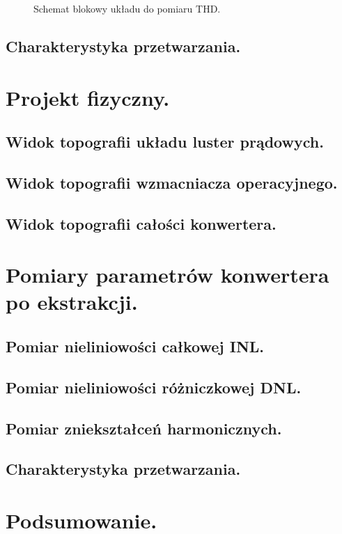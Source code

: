\documentclass[10pt,a4paper]{report}
\theoremstyle{definition}
\theoremstyle{definition}
\theoremstyle{definition}
\theoremstyle{definition}
\theoremstyle{definition}
\begin{document}
{\begin{figure}[!htb]
		\caption{Schemat blokowy układu do pomiaru THD.}
	\end{figure}
	\section{Charakterystyka przetwarzania.}
	\chapter{Projekt fizyczny.}
	\section{Widok topografii układu luster prądowych.}
	\section{Widok topografii wzmacniacza operacyjnego.}
	\section{Widok topografii całości konwertera.}
	
	\chapter{Pomiary parametrów konwertera po ekstrakcji.}
	\section{Pomiar nieliniowości całkowej INL.}
	\section{Pomiar nieliniowości różniczkowej DNL.}
	\section{Pomiar zniekształceń harmonicznych.}
	\section{Charakterystyka przetwarzania.}

	\chapter{Podsumowanie.}
}
\end{document}
